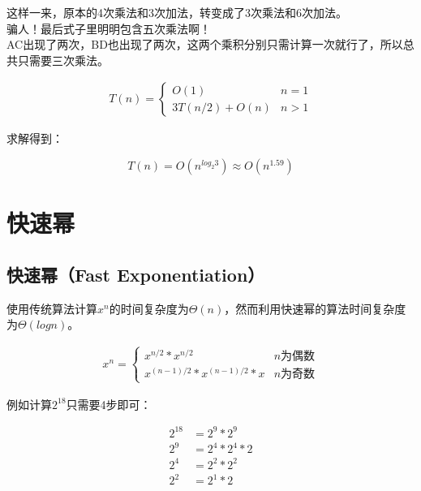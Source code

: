 这样一来，原本的4次乘法和3次加法，转变成了3次乘法和6次加法。\\

骗人！最后式子里明明包含五次乘法啊！\\

AC出现了两次，BD也出现了两次，这两个乘积分别只需计算一次就行了，所以总共只需要三次乘法。

\vspace{-0.5cm}

\begin{align*}
	T(n) = \begin{cases}
		O(1)           & n = 1 \\
		3T(n/2) + O(n) & n > 1
	\end{cases}
\end{align*}

求解得到：

\vspace{-0.5cm}

$$
	T(n) = O(n^{log_2{3}}) \approx O(n^{1.59})
$$

\newpage

\section{快速幂}

\subsection{快速幂（Fast Exponentiation）}

使用传统算法计算$ x^n $的时间复杂度为$ \Theta(n) $，然而利用快速幂的算法时间复杂度为$ \Theta(logn) $。

\vspace{-0.5cm}

\begin{align*}
	x^n = \begin{cases}
		x^{n/2} * x^{n/2}             & n\text{为偶数} \\
		x^{(n-1)/2} * x^{(n-1)/2} * x & n\text{为奇数}
	\end{cases}
\end{align*}

例如计算$ 2^{18} $只需要4步即可：

\vspace{-1cm}

\begin{align*}
	2^{18} & = 2^9 * 2^9     \\
	2^9    & = 2^4 * 2^4 * 2 \\
	2^4    & = 2^2 * 2^2     \\
	2^2    & = 2^1 * 2
\end{align*}

